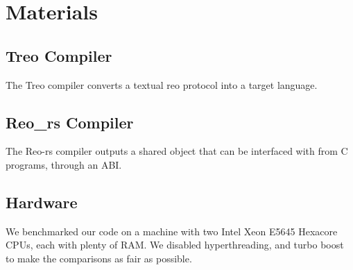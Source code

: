 \section{Materials}
\subsection{Treo Compiler} \label{sec:treo}
The Treo \cite{treo} compiler \cite{reo:git} converts a textual reo protocol into a target language.

\subsection{Reo\_rs Compiler}
The Reo-rs compiler \cite{reors:git} outputs a shared object that can be interfaced with from C programs, through an ABI.

\subsection{Hardware}
We benchmarked our code on a machine with two Intel Xeon E5645 Hexacore CPUs, each with plenty of RAM. We disabled hyperthreading, and turbo boost to make the comparisons as fair as possible. 
